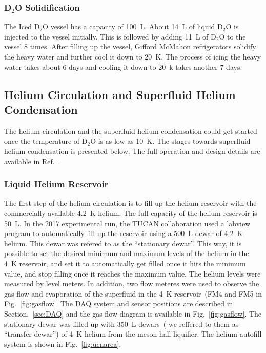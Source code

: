 \subsubsection{D$_2$O Solidification}
The Iced D$_2$O vessel has a capacity of 100~L. About 14~L of liquid
D$_2$O is injected to the vessel initially. This is followed by adding 11~L of
D$_2$O to the vessel 8 times.  After filling up the vessel,
Gifford McMahon refrigerators solidify the heavy water and further
cool it down to 20~K. The process of icing the heavy water takes about
6 days and cooling it down to 20~k takes another 7 days.


\subsection{Helium Circulation and Superfluid Helium Condensation}
The helium circulation and the superfluid helium condensation could
get started once the temperature of D$_2$O is as low as 10~K. The
stages towards superfluid helium condensation is presented below. The
full operation and design details are available in
Ref.~\cite{matsumiya_thesis}.

\subsubsection{Liquid Helium Reservoir}
The first step of the helium circulation is to fill up the helium
reservoir with the commercially available 4.2~K helium. The full
capacity of the helium reservoir is 50~L. In the 2017 experimental
run, the TUCAN collaboration used a labview program to automatically
fill up the reservoir using a 500~L dewar of 4.2~K helium. This dewar
was refered to as the ``stationary dewar''. This way, it is possible
to set the desired minimum and maximum levels of the helium in the 4~K
reservoir, and set it to automatically get filled once it hits the
minimum value, and stop filling once it reaches the maximum value. The
helium levels were measured by level meters. In addition, two flow
meteres were used to observe the gas flow and evaporation of the
superfluid in the 4~K reservoir~(FM4 and FM5 in
Fig.~\ref{fig:gasflow}. The DAQ system and sensor positions are
described in Section.~\ref{sec:DAQ} and the gas flow diagram is
available in Fig.~\ref{fig:gasflow}. The stationary dewar was filled
up with 350~L dewars~( we reffered to them as ``transfer dewar'') of
4~K helium from the meson hall liquifier. The helium autofill system
is shown in Fig.~\ref{fig:ucnarea}.

